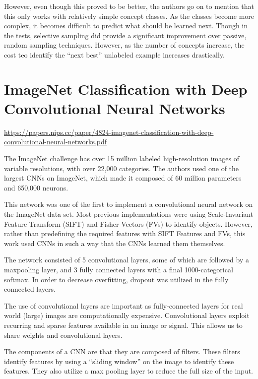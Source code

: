 \documentclass[english,course]{Notes}
\begin{document}
However, even though this proved to be better, the authors go on to mention that this only works with relatively simple concept classes. As the classes become more complex, it becomes difficult to predict what should be learned next. Though in the tests, selective sampling did provide a significant improvement over passive, random sampling techniques. However, as the number of concepts increase, the cost teo identify the ``next best'' unlabeled example increases drastically.



\section{ImageNet Classification with Deep Convolutional Neural Networks}

\url{https://papers.nips.cc/paper/4824-imagenet-classification-with-deep-convolutional-neural-networks.pdf}

The ImageNet challenge has over 15 million labeled high-resolution images of variable resolutions, with over 22,000 categories. The authors used one of the largest CNNs on ImageNet, which made it composed of 60 million parameters and 650,000 neurons. 

This network was one of the first to implement a convolutional neural network on the ImageNet data set. Most previous implementations were using Scale-Invariant Feature Transform (SIFT) and Fisher Vectors (FVs) to identify objects. However, rather than predefining the required features with SIFT Features and FVs, this work used CNNs in such a way that the CNNs learned them themselves.

The network consisted of 5 convolutional layers, some of which are followed by a maxpooling layer, and 3 fully connected layers with a final 1000-categorical softmax. In order to decrease overfitting, dropout was utilized in the fully connected layers. 

The use of convolutional layers are important as fully-connected layers for real world (large) images are computationally expensive. Convolutional layers exploit recurring and sparse features available in an image or signal. This allows us to share weights and convolutional layers. 

The components of a CNN are that they are composed of filters. These filters identify features by using a ``sliding window'' on the image to identify these features. They also utilize a max pooling layer to reduce the full size of the input.
\end{document}
